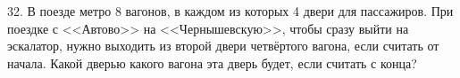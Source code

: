 32. В поезде метро 8 вагонов, в каждом из которых 4 двери для пассажиров. При поездке с <<Автово>> на <<Чернышевскую>>, чтобы сразу выйти на эскалатор, нужно выходить из второй двери четвёртого вагона, если считать от начала. Какой дверью какого вагона эта дверь будет, если считать с конца?\\
